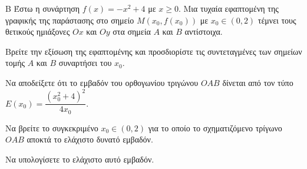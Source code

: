 \begin{thema}{Β}
Έστω η συνάρτηση $f(x) = -x^2+4$ με $x \ge 0$. Μια τυχαία εφαπτομένη της γραφικής της παράστασης στο σημείο $M(x_0, f(x_0))$ με $x_0 \in (0, 2)$ τέμνει τους θετικούς ημιάξονες $Ox$ και $Oy$ στα σημεία $A$ και $B$ αντίστοιχα.
\begin{erwthma}
  \item Βρείτε την εξίσωση της εφαπτομένης και προσδιορίστε τις συντεταγμένες των σημείων τομής $A$ και $B$ συναρτήσει του $x_0$.
  \item Να αποδείξετε ότι το εμβαδόν του ορθογωνίου τριγώνου $OAB$ δίνεται από τον τύπο $E(x_0) = \dfrac{(x_0^2+4)^2}{4x_0}$.
  \item Να βρείτε το συγκεκριμένο $x_0 \in (0, 2)$ για το οποίο το σχηματιζόμενο τρίγωνο $OAB$ αποκτά το ελάχιστο δυνατό εμβαδόν.
  \item Να υπολογίσετε το ελάχιστο αυτό εμβαδόν.
\end{erwthma}
\end{thema}
